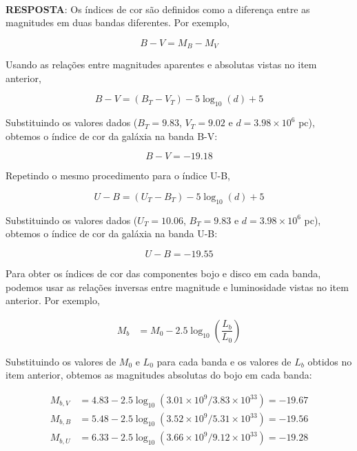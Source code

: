 \documentclass[a4paper,12pt]{article}
\begin{document}
\begin{enumerate}
\begin{enumerate}
\noindent\hrulefill\\\textbf{RESPOSTA}: Os índices de cor são definidos como a diferença entre as magnitudes em duas bandas diferentes. Por exemplo,

\begin{equation*}
B-V = M_B - M_V
\end{equation*}

Usando as relações entre magnitudes aparentes e absolutas vistas no item anterior,

\begin{equation*}
B-V = (B_T - V_T) -5\log_{10}(d) +5
\end{equation*}

Substituindo os valores dados ($B_T=9.83$, $V_T=9.02$ e $d=3.98\times 10^6$ pc), obtemos o índice de cor da galáxia na banda B-V:

\begin{equation*}
B-V = -19.18
\end{equation*}

Repetindo o mesmo procedimento para o índice U-B,

\begin{equation*}
U-B = (U_T - B_T) -5\log_{10}(d) +5
\end{equation*}

Substituindo os valores dados ($U_T=10.06$, $B_T=9.83$ e $d=3.98\times 10^6$ pc), obtemos o índice de cor da galáxia na banda U-B:

\begin{equation*}
U-B = -19.55
\end{equation*}

Para obter os índices de cor das componentes bojo e disco em cada banda, podemos usar as relações inversas entre magnitude e luminosidade vistas no item anterior. Por exemplo,

\begin{align*}
M_b &= M_0 -2.5\log_{10}\left(\dfrac{L_b}{L_0}\right)
\end{align*}

Substituindo os valores de $M_0$ e $L_0$ para cada banda e os valores de $L_b$ obtidos no item anterior, obtemos as magnitudes absolutas do bojo em cada banda:

\begin{align*}
M_{b,V} &= 4.83 - 2.5\log_{10}(3.01\times 10^9/3.83\times 10^{33}) = -19.67 \\
M_{b,B} &= 5.48 - 2.5\log_{10}(3.52\times 10^9/5.31\times 10^{33}) = -19.56 \\
M_{b,U} &= 6.33 - 2.5\log_{10}(3.66\times 10^9/9.12\times 10^{33}) = -19.28
\end{align*}


\end{enumerate}
\end{enumerate}
\end{document}
